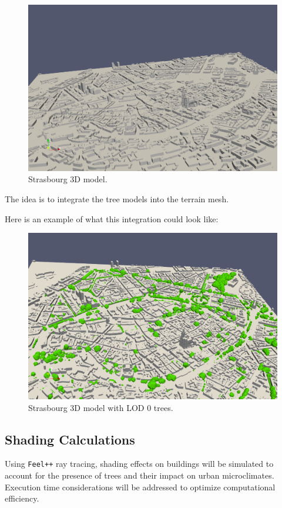 \documentclass[12pt]{article}
\begin{document}
\begin{figure}[H]
    \centering
    \includegraphics[width=1\textwidth]{images/stras_mesh.png}
    \caption{Strasbourg 3D model.}
\end{figure}

The idea is to integrate the tree models into the terrain mesh.

Here is an example of what this integration could look like:

\begin{figure}[H]
    \centering
    \includegraphics[width=1\textwidth]{images/stras_lod0.png}
    \caption{Strasbourg 3D model with LOD 0 trees.}
\end{figure}

\subsection{Shading Calculations}
Using \texttt{Feel++} ray tracing, shading effects on buildings will be simulated to account for the presence
of trees and their impact on urban microclimates. Execution time considerations will be
addressed to optimize computational efficiency.
\end{document}
